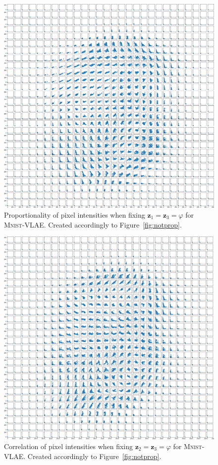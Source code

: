 \begin{figure}[H]
    \centering
    \includegraphics[width=\textwidth]{images/notprop/mnist/vlae/ccs_0_2_vlae.png}
    \caption[VLAE Pixel Proportionality - $\bm{z}_1$ vs. $\bm{z}_3$]{Proportionality of pixel intensities when fixing $\bm{z}_1 = \bm{z}_3=\varphi$ for \textsc{Mnist}-\ac{VLAE}. Created accordingly to Figure~\ref{fig:notprop}.}
\end{figure}

\begin{figure}[H]
    \centering
    \includegraphics[width=\textwidth]{images/notprop/mnist/vlae/ccs_1_2_vlae.png}
    \caption[\textsc{Mnist}-VLAE - Pixel Correlation - $\bm{z}_2$ vs. $\bm{z}_3$]{Correlation of pixel intensities when fixing $\bm{z}_2 = \bm{z}_3=\varphi$ for \textsc{Mnist}-\ac{VLAE}. Created accordingly to Figure~\ref{fig:notprop}.}
\end{figure}

